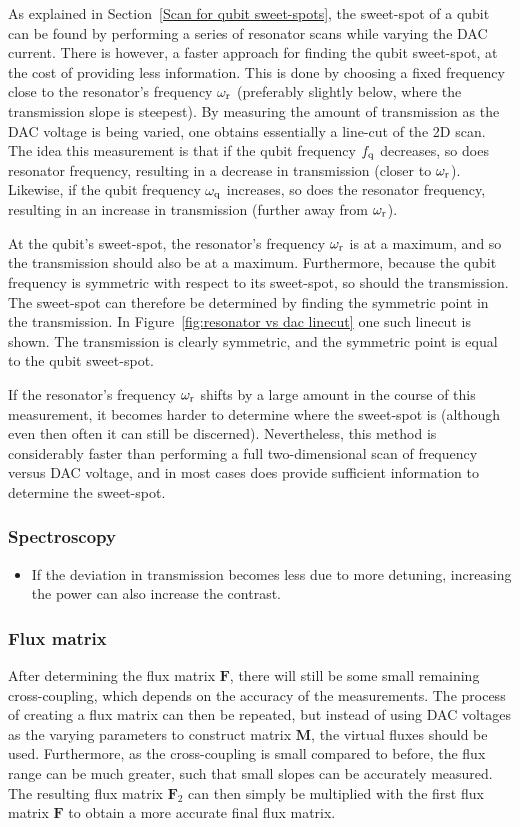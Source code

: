         As explained in Section~\ref{Scan for qubit sweet-spots}, the sweet-spot of a qubit can be found by performing a series of resonator scans while varying the DAC current. There is however, a faster approach for finding the qubit sweet-spot, at the cost of providing less information. This is done by choosing a fixed frequency close to the resonator's frequency $\omega_\text{r}$ (preferably slightly below, where the transmission slope is steepest). By measuring the amount of transmission as the DAC voltage is being varied, one obtains essentially a line-cut of the 2D scan. The idea this measurement is that if the qubit frequency $f_\text{q}$ decreases, so does resonator frequency, resulting in a decrease in transmission (closer to $\omega_\text{r}$). Likewise, if the qubit frequency $\omega_\text{q}$ increases, so does the resonator frequency, resulting in an increase in transmission (further away from $\omega_\text{r}$).

        At the qubit's sweet-spot, the resonator's frequency $\omega_\text{r}$ is at a maximum, and so the transmission should also be at a maximum. Furthermore, because the qubit frequency is symmetric with respect to its sweet-spot, so should the transmission. The sweet-spot can therefore be determined by finding the symmetric point in the transmission. In Figure~\ref{fig:resonator vs dac linecut} one such linecut is shown. The transmission is clearly symmetric, and the symmetric point is equal to the qubit sweet-spot.

        If the resonator's frequency $\omega_\text{r}$ shifts by a large amount in the course of this measurement, it becomes harder to determine where the sweet-spot is (although even then often it can still be discerned). Nevertheless, this method is considerably faster than performing a full two-dimensional scan of frequency versus DAC voltage, and in most cases does provide sufficient information to determine the sweet-spot.


      \subsubsection{Spectroscopy}
        \begin{itemize}
          \item If the deviation in transmission becomes less due to more detuning, increasing the power can also increase the contrast.
        \end{itemize}
      \subsubsection{Flux matrix}
        After determining the flux matrix $\boldsymbol{F}$, there will still be some small remaining cross-coupling, which depends on the accuracy of the measurements. The process of creating a flux matrix can then be repeated, but instead of using DAC voltages as the varying parameters to construct matrix $\boldsymbol{M}$, the virtual fluxes should be used. Furthermore, as the cross-coupling is small compared to before, the flux range can be much greater, such that small slopes can be accurately measured. The resulting flux matrix $\boldsymbol{F}_2$ can then simply be multiplied with the first flux matrix $\boldsymbol{F}$ to obtain a more accurate final flux matrix.
